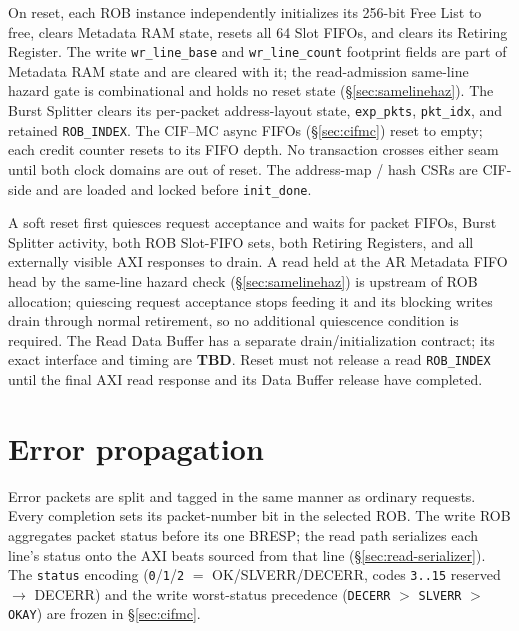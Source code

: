 On reset, each ROB instance independently initializes its 256-bit Free List
to free, clears Metadata RAM state, resets all 64 Slot FIFOs, and clears its
Retiring Register.  The write \texttt{wr\_line\_base} and \texttt{wr\_line\_count}
footprint fields are part of Metadata RAM state and are cleared with it; the
read-admission same-line hazard gate is combinational and holds no reset
state (\S\ref{sec:samelinehaz}).  The Burst Splitter clears its per-packet
address-layout state, \texttt{exp\_pkts}, \texttt{pkt\_idx}, and retained
\texttt{ROB\_INDEX}.
The CIF--MC async FIFOs (\S\ref{sec:cifmc}) reset to empty; each credit
counter resets to its FIFO depth.  No transaction crosses either seam until
both clock domains are out of reset.  The address-map / hash CSRs are
CIF-side and are loaded and locked before \texttt{init\_done}.

A soft reset first quiesces request acceptance and waits for packet FIFOs,
Burst Splitter activity, both ROB Slot-FIFO sets, both Retiring Registers, and
all externally visible AXI responses to drain.  A read held at the AR Metadata
FIFO head by the same-line hazard check (\S\ref{sec:samelinehaz}) is upstream
of ROB allocation; quiescing request acceptance stops feeding it and its
blocking writes drain through normal retirement, so no additional quiescence
condition is required.  The Read Data Buffer has a
separate drain/initialization contract; its exact interface and timing are
\textbf{TBD}.  Reset must not release a read \texttt{ROB\_INDEX} until the
final AXI read response and its Data Buffer release have completed.

\section{Error propagation}

Error packets are split and tagged in the same manner as ordinary
requests.  Every completion sets its packet-number bit in the selected ROB.
The write ROB aggregates packet status before its one BRESP; the read path
serializes each line's status onto the AXI beats sourced from that line
(\S\ref{sec:read-serializer}).  The \texttt{status} encoding
(\texttt{0}/\texttt{1}/\texttt{2} $=$ OK/SLVERR/DECERR, codes \texttt{3..15}
reserved $\rightarrow$ DECERR) and the write worst-status precedence
(\texttt{DECERR} $>$ \texttt{SLVERR} $>$ \texttt{OKAY}) are frozen in
\S\ref{sec:cifmc}.
